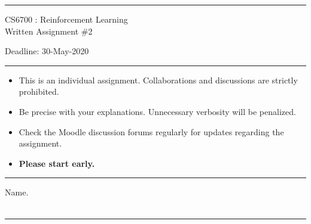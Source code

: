 \documentclass[solution,addpoints,12pt]{exam}
\begin{document}
\hrule
\vspace{1mm}
\noindent 
\begin{center}
{\Large CS6700 : Reinforcement Learning} \\
{\large Written Assignment \#2}
\end{center}
\vspace{1mm}
\noindent 
{Deadline: 30-May-2020}

\vspace{2mm}
\hrule

{\small

\begin{itemize}\itemsep0mm
\item This is an individual assignment. Collaborations and discussions are strictly
prohibited.
\item Be precise with your explanations. Unnecessary verbosity will be penalized.
\item Check the Moodle discussion forums regularly for updates regarding the assignment.
\item \textbf{Please start early.}

\end{itemize}
}

\hrule

\vspace{3mm}
 Name. \\[1mm]
 \\
\hrule
\end{document}
